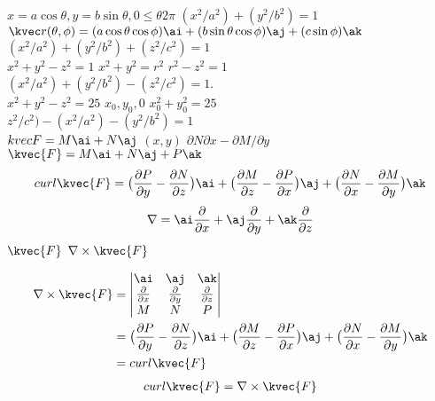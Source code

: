 \(x=a\cos \theta,y=b\sin \theta,0\le \theta 2\pi\)
\((x^{2}/a^{2})+(y^{2}/b^{2})=1\)
\(\kvec r(\theta,\phi)=(a\cos \theta\cos \phi)\ai+(b\sin \theta\cos \phi)\aj+(c\sin \phi)\ak\)
\((x^{2}/a^{2})+(y^{2}/b^{2})+(z^{2}/c^{2})=1\)\\
\(x^{2}+y^{2}-z^{2}=1\)
\(x^{2}+y^{2}=r^{2}\)
\(r^{2}-z^{2}=1\)\\
\((x^{2}/a^{2})+(y^{2}/b^{2})-(z^{2}/c^{2})=1.\)\\
\(x^{2}+y^{2}-z^{2}=25\)
\(x_{0},y_{0},0\)
\(x_{0}^{2}+y_{0}^{2}=25\)\\
\(z^{2}/c^{2})-(x^{2}/a^{2})-(y^{2}/b^{2})=1\)\\


\(kvec {F}=M\ai+N\aj\)
\((x,y)\)
\(\partial N\partial x-\partial M/\partial y\)
\(\kvec {F}=M\ai+N\aj+P\ak\)\\
\begin{align}
curl\kvec {F}=\big(\frac{\partial P}{\partial y}-\frac{\partial N}{\partial z}\big)\ai+\big(\frac{\partial M}{\partial z}-\frac{\partial P}{\partial x}\big)\aj+\big(\frac{\partial N}{\partial x}-\frac{\partial M}{\partial y}\big)\ak
\end{align}
\begin{align}
\nabla=\ai\frac{\partial}{\partial x}+\aj\frac{\partial}{\partial y}+\ak\frac{\partial}{\partial z}
\end{align}
\(\kvec {F}\)
\(\nabla\times\kvec {F}\)

\begin{gather}
\begin{aligned}
\nabla\times\kvec {F}&=\begin{vmatrix}
\ai&\aj&\ak\\
\frac{\partial}{\partial x}&\frac{\partial}{\partial y}&\frac{\partial}{\partial z}\\
M&N&P
\end{vmatrix}\\
&=\big(\frac{\partial P}{\partial y}-\frac{\partial N}{\partial z}\big)\ai+\big(\frac{\partial M}{\partial z}-\frac{\partial P}{\partial x}\big)\aj+\big(\frac{\partial N}{\partial x}-\frac{\partial M}{\partial y}\big)\ak\\
&=curl\kvec{F}
\end{aligned}
\end{gather}
\begin{align}
curl\kvec {F}=\nabla \times\kvec {F}
\end{align}

